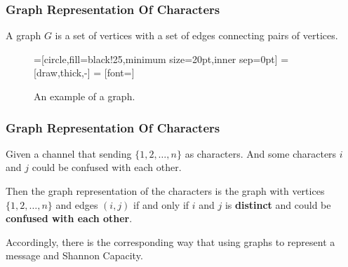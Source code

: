 \begin{frame}
      \frametitle{Graph Representation Of Characters}
      \begin{definition}[graph] \label{def:graph}
            A graph $ G $ is a set of vertices with a set of edges connecting pairs of vertices.

            \begin{figure}[h!]
                  =[circle,fill=black!25,minimum size=20pt,inner sep=0pt]
                   = [draw,thick,-]
                   = [font=\small]
                  \label{fig:graphDefinitionExample}
                  \caption{An example of a graph.}
            \end{figure}
      \end{definition}
\end{frame}

\begin{frame}
      \frametitle{Graph Representation Of Characters}
      \begin{definition}\label{def:graphRepresetationOfChannel}
            Given a channel that sending $\{1,2,\dots,n\}$ as characters. And some characters $i$ and $j$ could be confused with each other.

            \smallskip

            Then the graph representation of the characters is the graph with vertices $\{1,2,\dots,n\}$ and edges $(i,j)$ if and only if $i$ and $j$ is \textbf{distinct} and could be \textbf{confused with each other}.
      \end{definition}

      Accordingly, there is the corresponding way that using graphs to represent a message and Shannon Capacity.
\end{frame}

